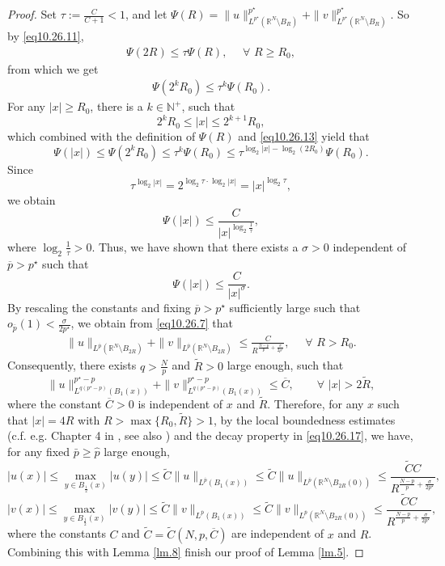 \documentclass[12pt]{amsart}
\theoremstyle{definition}
\theoremstyle{remark}
\theoremstyle{conclusion}
\theoremstyle{conjecture}
\numberwithin{equation}{section}
\newcommand{\R}{\mathbb{R}}
\newcommand{\N}{\mathbb{N}}
\begin{document}
\begin{proof}
Set $\tau:= \frac{C}{C+1}<1$, and let $\Psi(R)=\| u \|^{p^{\star}}_{L^{p^{\star}}(\R^N \setminus B_R)}+\| v \|^{p^{\star}}_{L^{p^{\star}}(\R^N \setminus B_R)}$. So by \eqref{eq10.26.11},
\begin{align}\label{eq10.26.12}
\Psi(2R)\leq \tau \Psi(R),\,\,\quad \forall \,\, R\geq R_0,
\end{align}
from which we get
\begin{align}\label{eq10.26.13}
\Psi(2^k R_0)\leq \tau^k \Psi(R_0).
\end{align}
For any $|x|\geq R_0$, there is a $k\in \N^+$, such that
$$ 2^k R_0 \leq |x| \leq 2^{k+1} R_0,$$
which combined with the definition of $\Psi(R)$ and \eqref{eq10.26.13} yield that
$$ \Psi(|x|) \leq \Psi(2^k R_0)\leq \tau^k \Psi(R_0) \leq \tau^{\log_2 |x|-\log_2 (2R_{0})} \Psi(R_0).$$
Since
$$ \tau^{\log_2 |x|}= 2^{\log_2\tau \cdot \log_2 |x|} = |x|^{\log_2\tau},$$
we obtain
$$ \Psi(|x|) \leq \frac{C}{|x|^{\log_2 \frac{1}{\tau}}},$$
where $\log_2 \frac{1}{\tau} >0$.
Thus, we have shown that there exists a $\sigma>0$ independent of $\overline{p}>p^{\star}$ such that
$$ \Psi(|x|) \leq \frac{C}{|x|^\sigma}.$$
By rescaling the constants and fixing $\overline{p}>p^{\star}$ sufficiently large such that $o_{\overline{p}}(1)<\frac{\sigma}{2p^{\star}}$, we obtain from \eqref{eq10.26.7} that
\begin{align}\label{eq10.26.17}
\| u \|_{L^{\overline{p}}(\R^N \setminus B_{2R})}+\| v \|_{L^{\overline{p}}(\R^N \setminus B_{2R})} \leq \frac{C}{R^{ \frac{N-p}{p}+\frac{\sigma}{2p^{\star}}}},\,\quad\,\forall \,\,R>R_0.
\end{align}
Consequently, there exists $q>\frac{N}{p}$ and $\widetilde{R}>0$ large enough, such that
\begin{equation*}
  \|u\|^{p^{\star}-p}_{L^{q(p^{\star}-p)}(B_{1}(x))}+\|v\|^{p^{\star}-p}_{L^{q(p^{\star}-p)}(B_{1}(x))}\leq \overline{C}, \qquad \forall \,\, |x|>2\widetilde{R},
\end{equation*}
where the constant $\overline{C}>0$ is independent of $x$ and $\widetilde{R}$. Therefore, for any $x$ such that $|x|=4R$ with $R>\max\{R_0,\widetilde{R}\}>1$, by the local boundedness estimates (c.f. e.g. Chapter 4 in \cite{HL}, see also \cite{ED83,KM,PT,XCL}) and the decay property in \eqref{eq10.26.17}, we have, for any fixed $\bar{p}\geq\hat{p}$ large enough,
$$ |u(x)|\leq \max_{y\in B_{\frac{1}{2}}(x)} |u(y)| \leq \widetilde{C}\|u\|_{L^{\overline{p}}(B_1(x))}\leq \widetilde{C}\|u\|_{L^{\overline{p}}(\R^N \setminus B_{2R}(0))} \leq \frac{\widetilde{C}C}{R^{ \frac{N-p}{p}+\frac{\sigma}{2p^{\star}}}},$$
$$ |v(x)|\leq \max_{y\in B_{\frac{1}{2}}(x)} |v(y)| \leq \widetilde{C}\|v\|_{L^{\overline{p}}(B_1(x))}\leq \widetilde{C}\|v\|_{L^{\overline{p}}(\R^N \setminus B_{2R}(0))} \leq \frac{\widetilde{C}C}{R^{ \frac{N-p}{p}+\frac{\sigma}{2p^{\star}}}},$$
where the constants $C$ and $\widetilde{C}=\widetilde{C}(N,p,\overline{C})$ are independent of $x$ and $R$. Combining this with Lemma \ref{lm.8} finish our proof of Lemma \ref{lm.5}.
\end{proof}
\end{document}
